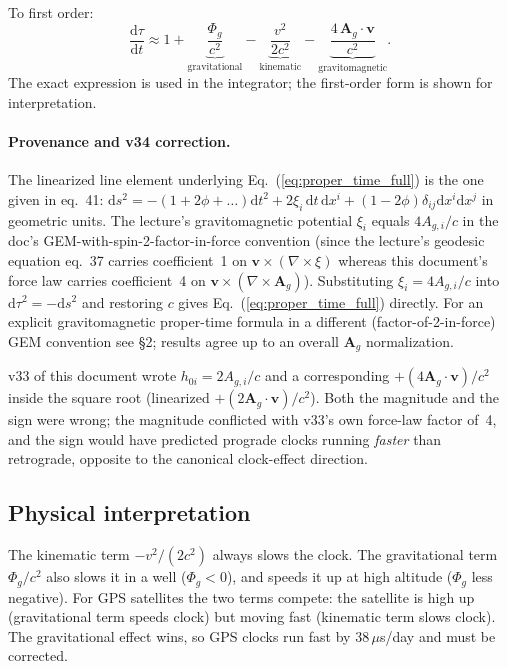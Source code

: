 \documentclass[11pt,a4paper]{article}
\newcommand{\vv}[1]{\mathbf{#1}}
\newcommand{\Phig}{\Phi_g}
\newcommand{\Ag}{\vv{A}_g}
\newcommand{\dd}{\mathrm{d}}
\begin{document}
To first order:
\begin{equation}
  \frac{\dd\tau}{\dd t} \approx 1 + \underbrace{\frac{\Phig}{c^2}}_{\text{gravitational}} - \underbrace{\frac{v^2}{2c^2}}_{\text{kinematic}} - \underbrace{\frac{4\,\Ag\cdot\vv{v}}{c^2}}_{\text{gravitomagnetic}}.
\end{equation}
The exact expression is used in the integrator; the first-order form is shown for interpretation.

\paragraph{Provenance and v34 correction.}  The linearized line element
underlying Eq.~(\ref{eq:proper_time_full}) is the one given in
\cite{AliHaimoud2019} eq.~41:
$\dd s^2 = -(1+2\phi+\ldots)\dd t^2 + 2\xi_i\,\dd t\,\dd x^i + (1-2\phi)\delta_{ij}\dd x^i\dd x^j$
in geometric units.  The lecture's gravitomagnetic potential $\xi_i$ equals
$4A_{g,i}/c$ in the doc's GEM-with-spin-2-factor-in-force convention (since
the lecture's geodesic equation eq.~37 carries coefficient~1 on
$\vv{v}\times(\nabla\times\xi)$ whereas this document's force law carries
coefficient~4 on $\vv{v}\times(\nabla\times\Ag)$).  Substituting
$\xi_i = 4A_{g,i}/c$ into $\dd\tau^2 = -\dd s^2$ and restoring $c$ gives
Eq.~(\ref{eq:proper_time_full}) directly.  For an explicit gravitomagnetic
proper-time formula in a different (factor-of-2-in-force) GEM convention
see \cite{Mashhoon2003} \S2; results agree up to an overall $\Ag$
normalization.

v33 of this document wrote $h_{0i} = 2A_{g,i}/c$ and a corresponding
$+(4\Ag\cdot\vv{v})/c^2$ inside the square root (linearized
$+(2\Ag\cdot\vv{v})/c^2$).  Both the magnitude and the sign were wrong;
the magnitude conflicted with v33's own force-law factor of~4, and the
sign would have predicted prograde clocks running \emph{faster} than
retrograde, opposite to the canonical clock-effect direction.

\subsection{Physical interpretation}

The kinematic term $-v^2/(2c^2)$ always slows the clock.  The gravitational term $\Phig/c^2$ also slows it in a well ($\Phig<0$), and speeds it up at high altitude ($\Phig$ less negative).  For GPS satellites the two terms compete: the satellite is high up (gravitational term speeds clock) but moving fast (kinematic term slows clock).  The gravitational effect wins, so GPS clocks run fast by $38\,\mu$s/day and must be corrected.
\end{document}

